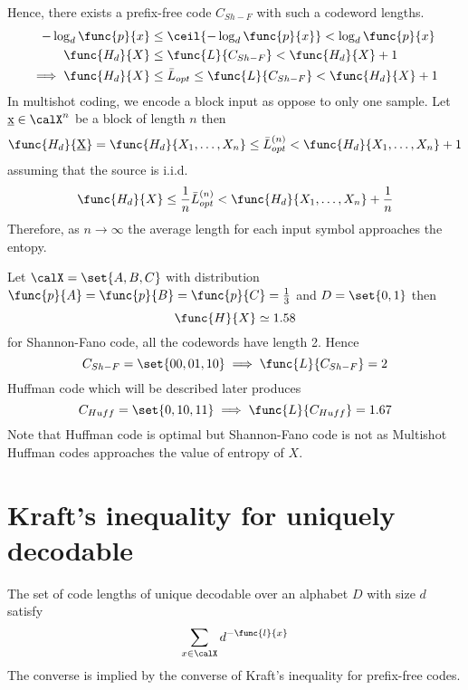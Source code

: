 Hence, there exists a prefix-free code \(C_{Sh-F}\) with such a codeword lengths. 
\begin{align*}
    - \log_d \func{p}{x} &\leq \ceil{- \log_d \func{p}{x}} < \log_d \func{p}{x}\\
    \func{H_d}{X} &\leq \func{L}{C_{Sh-F}} < \func{H_d}{X} + 1\\ 
    \implies \func{H_d}{X} &\leq \bar{L}_{opt} \leq \func{L}{C_{Sh-F}} < \func{H_d}{X} + 1\\ 
\end{align*}
In multishot coding, we encode a block input as oppose to only one sample. Let \(\underbar{x} \in \calX^n\) be a block of length \(n\) then 
\begin{equation*}
    \func{H_d}{\underbar{X}} = \func{H_d}{X_1, \dots , X_n} \leq \bar{L}^{(n)}_{opt} < \func{H_d}{X_1, \dots , X_n} + 1 
\end{equation*}
assuming that the source is i.i.d. 
\begin{equation*}
    \func{H_d}{X} \leq \dfrac{1}{n} \bar{L}^{(n)}_{opt} < \func{H_d}{X_1, \dots , X_n} + \dfrac{1}{n}
\end{equation*}
Therefore, as \(n \to \infty\) the average length for each input symbol approaches the entopy.
\begin{example}
    Let \(\calX = \set{A,B,C}\) with distribution \(\func{p}{A} = \func{p}{B} = \func{p}{C} = \frac{1}{3}\) and \(D = \set{0,1}\) then 
    \begin{equation*}
        \func{H}{X} \simeq 1.58
    \end{equation*}
    for Shannon-Fano code, all the codewords have length 2. Hence 
    \begin{equation*}
        C_{Sh-F} = \set{00,01,10} \implies \func{L}{C_{Sh-F}} = 2
    \end{equation*}
    Huffman code which will be described later produces 
    \begin{equation*}
        C_{Huff} = \set{0,10,11} \implies \func{L}{C_{Huff}} = 1.67
    \end{equation*}
    Note that Huffman code is optimal but Shannon-Fano code is not as Multishot Huffman codes approaches the value of entropy of \(X\).
\end{example}
\section{Kraft's inequality for uniquely decodable}
\begin{theorem}
    The set of code lengths of unique decodable over an alphabet \(D\) with size \(d\) satisfy 
    \begin{equation*}
        \sum_{x \in \calX} d^{-\func{l}{x}}
    \end{equation*}
    The converse is implied by the converse of Kraft's inequality for prefix-free codes.
\end{theorem}


